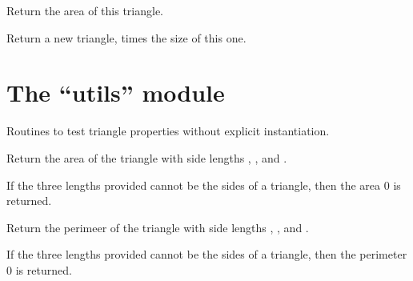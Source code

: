 \documentclass[letterpaper,10pt,english]{sphinxmanual}
\begin{document}
\begin{fulllineitems}
\begin{fulllineitems}
\label{\detokenize{api:trianglelib.shape.Triangle.area}}
Return the area of this triangle.

\end{fulllineitems}


\begin{fulllineitems}
\label{\detokenize{api:trianglelib.shape.Triangle.scale}}
Return a new triangle,  times the size of this one.

\end{fulllineitems}


\end{fulllineitems}



\section{The “utils” module}
\label{\detokenize{api:module-trianglelib.utils}}\label{\detokenize{api:the-utils-module}}
Routines to test triangle properties without explicit instantiation.

\begin{fulllineitems}
\label{\detokenize{api:trianglelib.utils.compute_area}}
Return the area of the triangle with side lengths , , and .

If the three lengths provided cannot be the sides of a triangle,
then the area 0 is returned.

\end{fulllineitems}


\begin{fulllineitems}
\label{\detokenize{api:trianglelib.utils.compute_perimeter}}
Return the perimeer of the triangle with side lengths , , and .

If the three lengths provided cannot be the sides of a triangle,
then the perimeter 0 is returned.

\end{fulllineitems}
\end{document}
